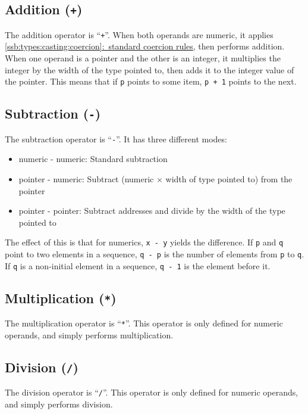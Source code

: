 \documentclass{article}
\newcommand{\textref}[2]{\hyperref[#1]{\underline{\ref*{#1}:~#2}}}
\begin{document}
\subsection{Addition (\texttt{+})}
\label{sub:operators:add}
The addition operator is ``\texttt{+}''. When both operands are numeric, it
applies \textref{ssb:types:casting:coercion}{standard coercion rules}, then
performs addition. When one operand is a pointer and the other is an integer,
it multiplies the integer by the width of the type pointed to, then adds it to
the integer value of the pointer. This means that if \texttt{p} points to some
item, \texttt{p~+~1} points to the next.

\subsection{Subtraction (\texttt{-})}
\label{sub:operators:sub}
The subtraction operator is ``\texttt{-}''. It has three different modes:
\begin{itemize}
  \item{numeric - numeric: Standard subtraction}
  \item{pointer - numeric: Subtract (numeric $\times$ width of type pointed to)
    from the pointer}
  \item{pointer - pointer: Subtract addresses and divide by the width of the
    type pointed to}
\end{itemize}
The effect of this is that for numerics, \texttt{x~-~y} yields the difference.
If \texttt{p} and \texttt{q} point to two elements in a sequence,
\texttt{q~-~p} is the number of elements from \texttt{p} to \texttt{q}.
If \texttt{q} is a non-initial element in a sequence, \texttt{q~-~1} is the
element before it.

\subsection{Multiplication (\texttt{*})}
\label{sub:operators:mul}
The multiplication operator is ``\texttt{*}''. This operator is only defined for
numeric operands, and simply performs multiplication.

\subsection{Division (\texttt{/})}
\label{sub:operators:mul}
The division operator is ``\texttt{/}''. This operator is only defined for
numeric operands, and simply performs division.
\end{document}
